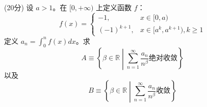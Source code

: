 \documentclass[loose]{ExBook}
\begin{document}
\begin{qitems}
    \begin{bbox}
        \qitem (20分) 设 \(a > 1\)。在 \([0,+\infty)\) 上定义函数 \(f\)：
        \[
        f(x) = 
        \begin{cases}
        -1, & x \in [0,a) \\
        (-1)^{k+1}, & x \in [a^k, a^{k+1}), k \geq 1
        \end{cases}
        \]
        定义 \(a_n = \int_0^n f(x) dx\)。求
        \[
        A \equiv \left\{ \beta \in \mathbb{R} \middle| \sum_{n=1}^\infty \frac{a_n}{n^\beta} \text{绝对收敛} \right\}
        \]
        以及
        \[
        B \equiv \left\{ \beta \in \mathbb{R} \middle| \sum_{n=1}^\infty \frac{a_n}{n^\beta} \text{收敛} \right\}
        \]
    \end{bbox}

\end{qitems}
\end{document}
